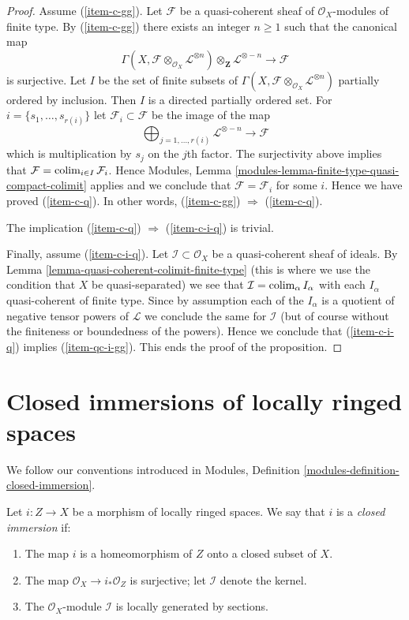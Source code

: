 \begin{proof}
\medskip\noindent
Assume (\ref{item-c-gg}). Let $\mathcal{F}$ be a quasi-coherent
sheaf of $\mathcal{O}_X$-modules of finite type.
By (\ref{item-c-gg}) there exists an integer $n \geq 1$ such that
the canonical map
$$
\Gamma(X, \mathcal{F} \otimes_{\mathcal{O}_X} \mathcal{L}^{\otimes n})
\otimes_{\mathbf{Z}} \mathcal{L}^{\otimes -n}
\longrightarrow
\mathcal{F}
$$
is surjective. Let $I$ be the set of finite subsets of
$\Gamma(X, \mathcal{F} \otimes_{\mathcal{O}_X} \mathcal{L}^{\otimes n})$
partially ordered by inclusion. Then $I$ is a directed partially ordered set.
For $i = \{s_1, \ldots, s_{r(i)}\}$ let $\mathcal{F}_i \subset \mathcal{F}$
be the image of the map
$$
\bigoplus\nolimits_{j = 1, \ldots, r(i)} \mathcal{L}^{\otimes -n}
\longrightarrow
\mathcal{F}
$$
which is multiplication by $s_j$ on the $j$th factor. The surjectivity above
implies that $\mathcal{F} = \mathop{\mathrm{colim}}\nolimits_{i \in I} \mathcal{F}_i$.
Hence Modules, Lemma \ref{modules-lemma-finite-type-quasi-compact-colimit}
applies and we conclude that
$\mathcal{F} = \mathcal{F}_i$ for some $i$.
Hence we have proved (\ref{item-c-q}). In other words,
(\ref{item-c-gg}) $\Rightarrow$ (\ref{item-c-q}).

\medskip\noindent
The implication (\ref{item-c-q}) $\Rightarrow$ (\ref{item-c-i-q}) is trivial.

\medskip\noindent
Finally, assume (\ref{item-c-i-q}).
Let $\mathcal{I} \subset \mathcal{O}_X$ be a quasi-coherent sheaf
of ideals. By Lemma \ref{lemma-quasi-coherent-colimit-finite-type}
(this is where we use the condition that $X$ be quasi-separated)
we see that $\mathcal{I} = \mathop{\mathrm{colim}}\nolimits_\alpha I_\alpha$ with
each $I_\alpha$ quasi-coherent of finite type. Since by assumption each of
the $I_\alpha$ is a quotient of negative tensor powers of
$\mathcal{L}$ we conclude the same for $\mathcal{I}$ (but of course
without the finiteness or boundedness of the powers). Hence
we conclude that (\ref{item-c-i-q}) implies (\ref{item-qc-i-gg}).
This ends the proof of the proposition.
\end{proof}


\section{Closed immersions of locally ringed spaces}
\label{section-closed-immersion}

\noindent
We follow our conventions introduced in
Modules, Definition \ref{modules-definition-closed-immersion}.

\begin{definition}
\label{definition-closed-immersion-locally-ringed-spaces}
Let $i : Z \to X$ be a morphism of locally ringed spaces.
We say that $i$ is a {\it closed immersion} if:
\begin{enumerate}
\item The map $i$ is a homeomorphism of $Z$ onto a closed subset of $X$.
\item The map $\mathcal{O}_X \to i_*\mathcal{O}_Z$ is surjective;
let $\mathcal{I}$ denote the kernel.
\item The $\mathcal{O}_X$-module $\mathcal{I}$
is locally generated by sections.
\end{enumerate}
\end{definition}

